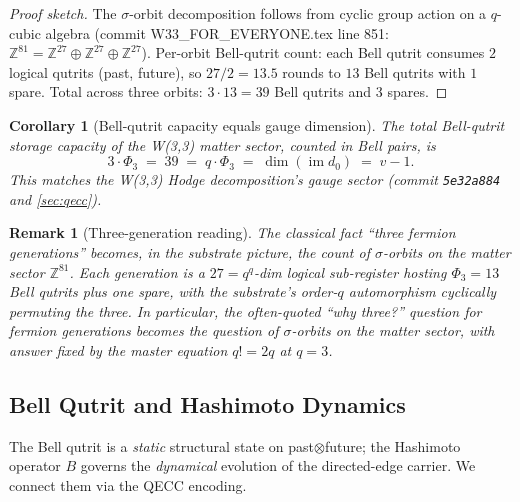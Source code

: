﻿\documentclass[12pt]{article}
\newtheorem{corollary}[theorem]{Corollary}
\newtheorem{remark}[theorem]{Remark}
\newcommand{\ZZ}{\mathbb{Z}}
\begin{document}
\begin{proof}[Proof sketch]
The $\sigma$-orbit decomposition follows from cyclic group action on a
$q$-cubic algebra (commit W33\_FOR\_EVERYONE.tex line 851: $\ZZ^{81} =
\ZZ^{27} \oplus \ZZ^{27} \oplus \ZZ^{27}$).  Per-orbit Bell-qutrit count:
each Bell qutrit consumes $2$ logical qutrits (past, future), so $27/2 =
13.5$ rounds to $13$ Bell qutrits with $1$ spare.  Total across three
orbits: $3 \cdot 13 = 39$ Bell qutrits and $3$ spares.
\end{proof}

\begin{corollary}[Bell-qutrit capacity equals gauge dimension]\label{cor:bell_gauge}
The total Bell-qutrit storage capacity of the W(3,3) matter sector,
counted in Bell pairs, is
\begin{equation}
  3 \cdot \Phi_3  \;=\;  39  \;=\;  q \cdot \Phi_3  \;=\;  \dim(\operatorname{im} d_0)
  \;=\; v - 1.
\end{equation}
This matches the W(3,3) Hodge decomposition's \emph{gauge sector}
(commit \texttt{5e32a884} and \cref{sec:qecc}).
\end{corollary}

\begin{remark}[Three-generation reading]
The classical fact ``three fermion generations'' becomes, in the
substrate picture, the count of $\sigma$-orbits on the matter sector
$\ZZ^{81}$.  Each generation is a $27 = q^q$-dim logical sub-register
hosting $\Phi_3 = 13$ Bell qutrits plus one spare, with the substrate's
order-$q$ automorphism cyclically permuting the three.  In particular,
the often-quoted ``why three?'' question for fermion generations becomes
the question of $\sigma$-orbits on the matter sector, with answer fixed
by the master equation $q! = 2q$ at $q = 3$.
\end{remark}

\subsection{Bell Qutrit and Hashimoto Dynamics}
\label{sec:bell_hashimoto}

The Bell qutrit is a \emph{static} structural state on past$\otimes$future;
the Hashimoto operator $B$ governs the \emph{dynamical} evolution of the
directed-edge carrier.  We connect them via the QECC encoding.
\end{document}
